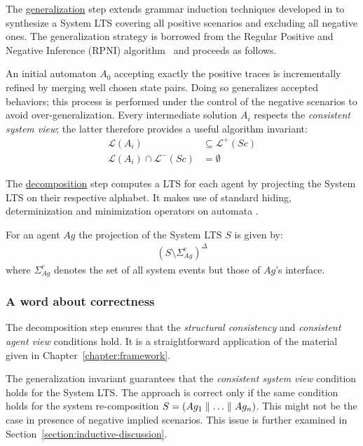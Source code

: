 The \underline{generalization} step extends grammar induction techniques developed in \cite{Oncina:1992} to synthesize a System LTS covering all positive scenarios and excluding all negative ones. The generalization strategy is borrowed from the Regular Positive and Negative Inference (RPNI) algorithm~\cite{Oncina:1992} and proceeds as follows.

An initial automaton $A_0$ accepting exactly the positive traces is incrementally refined by merging well chosen state pairs.
Doing so generalizes accepted behaviors; this process is performed under the control of the negative scenarios to avoid over-generalization. Every intermediate solution $A_i$ respects the \emph{consistent system view}; the latter therefore provides a useful algorithm invariant:
\begin{align*}
\mathcal{L}(A_i) &\subseteq \mathcal{L}^+(Sc)\\
\mathcal{L}(A_i) \cap \mathcal{L}^-(Sc) &= \emptyset
\end{align*}

The \underline{decomposition} step computes a LTS for each agent by projecting the System LTS on their respective alphabet. It makes use of standard hiding, determinization and minimization operators on automata \cite{Hopcroft:1979}. 

For an agent $Ag$ the projection of the System LTS $S$ is given by:
\begin{align}
(S \setminus \Sigma_{Ag}^c)^\Delta
\end{align}
\noindent where $\Sigma_{Ag}^c$ denotes the set of all system events but those of $Ag$'s interface.

\subsubsection*{A word about correctness}

The decomposition step ensures that the \emph{structural consistency} and \emph{consistent agent view} conditions hold. It is a straightforward application of the material given in Chapter~\ref{chapter:framework}. 

The generalization invariant guarantees that the \emph{consistent system view} condition holds for the System LTS. The approach is correct only if the same condition holds for the system re-composition $S = (Ag_1 \parallel \ldots \parallel Ag_n)$. This might not be the case in presence of negative implied scenarios. This issue is further examined in Section~\ref{section:inductive-discussion}.

